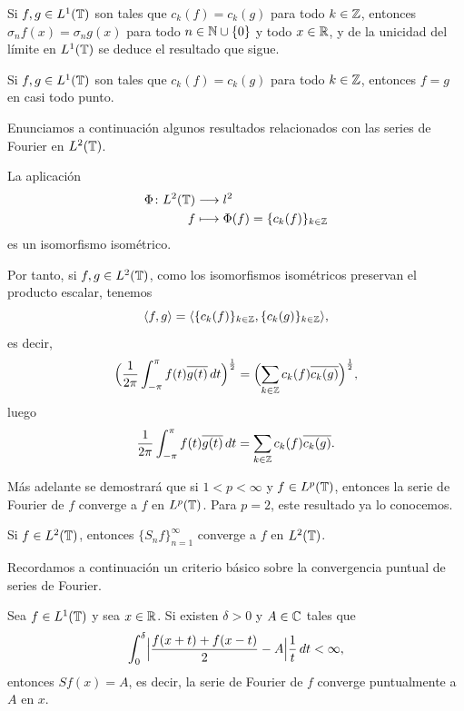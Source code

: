 \documentclass[a4paper, 12pt, oneside]{book}
\begin{document}
Si $f,g \in L^1(\mathbb T)$ son tales que $c_k(f) = c_k(g)$ para todo $k \in \mathbb Z$, entonces $\sigma_nf(x)=\sigma_ng(x)$ para todo $n \in \mathbb N \cup \{0\}$ y todo $x \in \mathbb R$, y de la unicidad del límite en $L^1(\mathbb T)$ se deduce el resultado que sigue.

\begin{corollary}\label{1.1.7}
    Si $f,g \in L^1(\mathbb T)$ son tales que $c_k(f) = c_k(g)$ para todo $k \in \mathbb Z$, entonces $f = g$ en casi todo punto.
\end{corollary}

Enunciamos a continuación algunos resultados relacionados con las series de Fourier en $L^2(\mathbb T)$.

\begin{theorem}
    La aplicación
    \begin{align*}
        \Phi \colon L^2(\mathbb T) &\longrightarrow l^2 \\
        f &\longmapsto \Phi(f) = \{c_k(f)\}_{k\in\mathbb Z}
    \end{align*}
    es un isomorfismo isométrico.
\end{theorem}

Por tanto, si $f,g \in L^2(\mathbb T)$, como los isomorfismos isométricos preservan el producto escalar, tenemos
\[\langle f,g \rangle = \langle \{c_k(f)\}_{k\in\mathbb Z}, \{c_k(g)\}_{k\in\mathbb Z} \rangle,\]
es decir,
\[\Bigl(\frac{1}{2\pi}\int_{-\pi}^{\pi} f(t)\overline{g(t)} \, dt\Bigr)^{\frac{1}{2}} = \Bigl(\sum_{k\in\mathbb Z} c_k(f)\overline{c_k(g)}\Bigr)^{\frac{1}{2}},\]
luego
\begin{equation}\label{1.2.9}
    \frac{1}{2\pi}\int_{-\pi}^{\pi} f(t)\overline{g(t)} \, dt = \sum_{k\in\mathbb Z} c_k(f)\overline{c_k(g)}.
\end{equation}

Más adelante se demostrará que si $1<p<\infty$ y $f\in L^p(\mathbb T)$, entonces la serie de Fourier de $f$ converge a $f$ en $L^p(\mathbb T)$. Para $p=2$, este resultado ya lo conocemos.
\begin{theorem}
    Si $f \in L^2(\mathbb T)$, entonces $\{S_nf\}_{n=1}^\infty$ converge a $f$ en $L^2(\mathbb T)$.
\end{theorem}

Recordamos a continuación un criterio básico sobre la convergencia puntual de series de Fourier.

\begin{theorem}
    Sea $f \in L^1(\mathbb T)$ y sea $x \in \mathbb R$. Si existen $\delta > 0$ y $A \in \mathbb C$ tales que
    \[\int_{0}^{\delta} \Bigl|\frac{f(x+t)+f(x-t)}{2}-A\Bigr|\frac{1}{t} \, dt < \infty,\]
    entonces $Sf(x) = A$, es decir, la serie de Fourier de $f$ converge puntualmente a $A$ en $x$.
\end{theorem}
\end{document}
